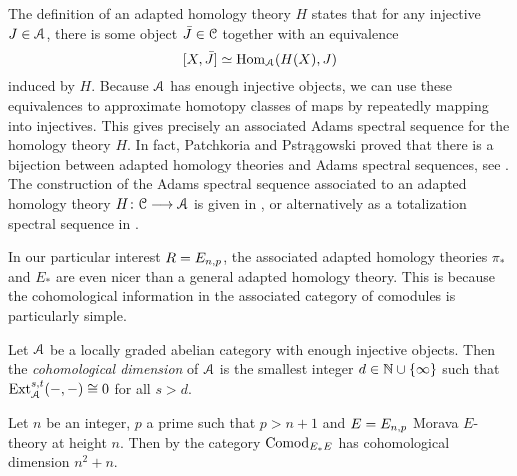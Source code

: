 \begin{remark}
    The definition of an adapted homology theory $H$ states that for any injective $J\in \EuScript{A}$, there is some object $\bar{J}\in \EuScript{C}$ together with an equivalence 
    \[[X,\bar{J}]\simeq \operatorname{Hom}_{\EuScript{A}}(H(X), J)\] 
    induced by $H$. Because $\EuScript{A}$ has enough injective objects, we can use these equivalences to approximate homotopy classes of maps by repeatedly mapping into injectives. This gives precisely an associated Adams spectral sequence for the homology theory $H$. In fact, Patchkoria and Pstr{\k a}gowski proved that there is a bijection between adapted homology theories and Adams spectral sequences, see \cite[3.24, 3.25]{patchkoria-pstragowski_2021}. The construction of the Adams spectral sequence associated to an adapted homology theory $H\colon \EuScript{C}\longrightarrow \EuScript{A}$ is given in \cite[2.24]{patchkoria-pstragowski_2021}, or alternatively as a totalization spectral sequence in \cite[2.27]{patchkoria-pstragowski_2021}. 
\end{remark}

In our particular interest $R=E_{n,p}$, the associated adapted homology theories $\pi_*$ and $E_*$ are even nicer than a general adapted homology theory. This is because the cohomological information in the associated category of comodules is particularly simple. 

\begin{definition}
    \label{ch1:def:cohomological-dimension}
    Let $\EuScript{A}$ be a locally graded abelian category with enough injective objects. Then the \emph{cohomological dimension} of $\EuScript{A}$ is the smallest integer $d\in \mathbb{N}\cup \{\infty\}$ such that $\operatorname{Ext}^{s,t}_{\EuScript{A}}(-,-) \cong 0$ for all $s>d$. 
\end{definition}

\begin{example}
    \label{ch1:ex:cohomological-dimension-comodEE}
    Let $n$ be an integer, $p$ a prime such that $p>n+1$ and $E=E_{n,p}$ Morava $E$-theory at height $n$. Then by \cite[2.5]{pstragowski_2021} the category $\mathrm{Comod}_{E_*E}$ has cohomological dimension $n^2+n$. 
\end{example}

